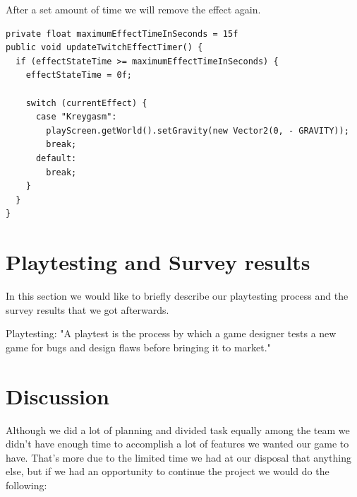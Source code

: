 \documentclass[12p]{article}
\begin{document}
After a set amount of time we will remove the effect again.

\begin{verbatim}
private float maximumEffectTimeInSeconds = 15f
public void updateTwitchEffectTimer() {
  if (effectStateTime >= maximumEffectTimeInSeconds) {
    effectStateTime = 0f;

    switch (currentEffect) {
      case "Kreygasm":
        playScreen.getWorld().setGravity(new Vector2(0, - GRAVITY));
        break;
      default:
        break;
    }
  }
}
\end{verbatim}


\newpage
\section{Playtesting and Survey results}

In this section we would like to briefly describe our playtesting process and the survey results that we got afterwards.

Playtesting:
"A playtest is the process by which a game designer tests a new game for bugs and design flaws before bringing it to market." \cite{Playtest}




\newpage
\section{Discussion} \label{Discussion}

Although we did a lot of planning and divided task equally among the team we didn't have enough time to accomplish a lot of features we wanted our game to have. That's more due to the limited time we had at our disposal that anything else, but if we had an opportunity to continue the project we would do the following:
\end{document}
